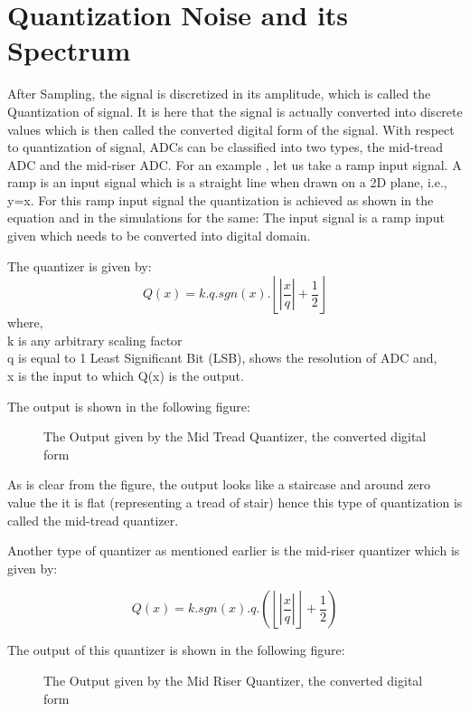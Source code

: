 \documentclass[colorlinks=true,pdfstartview=FitV,linkcolor=blue,
            citecolor=red,urlcolor=magenta]{ligodoc}
\begin{document}
 \section{Quantization Noise and its Spectrum}
 After Sampling, the signal is discretized in its amplitude, which is called the Quantization of signal. It is here that the signal is actually converted into discrete values which is then called the converted digital form of the signal. 
 With respect to quantization of signal, ADCs can be classified into two types, the mid-tread ADC and the mid-riser ADC.
 For an example \cite{Wikipedia}, let us take a ramp input signal. A ramp is an input signal which is a straight line when drawn on a 2D plane, i.e., y=x. For this ramp input signal the quantization is achieved as shown in the equation and in the simulations for the same:
 The input signal is a ramp input given which needs to be converted into digital domain.

 The quantizer is given by:
\begin{equation}
Q(x)=k.q.sgn(x).\left\lfloor\left|\frac{x}{q}\right|+\frac{1}{2}\right\rfloor
\end{equation}
 where,\\ k is any arbitrary scaling factor\\
 q is equal to 1 Least Significant Bit (LSB), shows the resolution of ADC
 and, \\
 x is the input to which Q(x) is the output.
 
   
The output is shown in the following figure: 
\begin{figure}[htbp]
 
  \centering
  
  \caption{The Output given by the Mid Tread Quantizer, the converted digital form}
\end{figure}

As is clear from the figure, the output looks like a staircase and around zero value the it is flat (representing a tread of stair) hence this type of quantization is called the mid-tread quantizer. 

Another type of quantizer as mentioned earlier is the mid-riser quantizer which is given by:

\begin{equation}
Q(x)=k.sgn(x).q.\left(\left\lfloor\left|\frac{x}{q}\right|\right\rfloor + \frac{1}{2} \right)
\end{equation}

The output of this quantizer is shown in the following figure:
\begin{figure}[htbp] 
 \centering
 
 \caption{The Output given by the Mid Riser Quantizer, the converted digital form} 
\end{figure}
\end{document}

